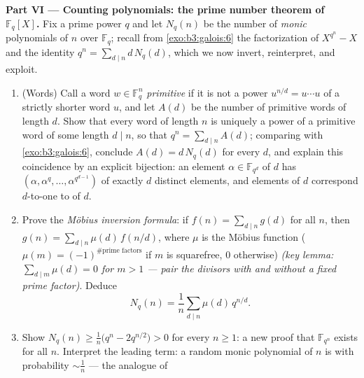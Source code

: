 \begin{problem}
\medskip
\noindent\textbf{Part VI --- Counting  polynomials:
the prime number theorem of $\mathbb F_q[X]$.} Fix a prime power
$q$ and let $N_q(n)$ be the number of \emph{monic }
polynomials of  $n$ over $\mathbb F_q$; recall from
\cref{exo:b3:galois:6} the factorization of $X^{q^n} - X$ and
the identity $q^n = \sum_{d\mid n}d\,N_q(d)$, which we now
invert, reinterpret, and exploit.
\begin{enumerate}[resume]
  \item (Words) Call a word $w \in \mathbb F_q^n$
        \emph{primitive} if it is not a power $u^{n/d} =
        u\cdots u$ of a strictly shorter word $u$, and let
        $A(d)$ be the number of primitive words of length $d$.
        Show that every word of length $n$ is uniquely a power
        of a primitive word of some length $d \mid n$, so that
        $q^n = \sum_{d \mid n}A(d)$; comparing with
        \cref{exo:b3:galois:6}, conclude $A(d) = d\,N_q(d)$
        for every $d$, and explain this coincidence by an
        explicit bijection: an element $\alpha \in
        \mathbb F_{q^d}$ of  $d$ has  
        $(\alpha, \alpha^q, \dots, \alpha^{q^{d-1}})$ of
        exactly $d$ distinct elements, and elements of 
        $d$ correspond $d$-to-one to  of 
        $d$.
  \item Prove the \emph{M\"obius inversion formula}: if $f(n) =
        \sum_{d\mid n}g(d)$ for all $n$, then $g(n) =
        \sum_{d\mid n}\mu(d)\,f(n/d)$, where $\mu$ is the
        M\"obius function ($\mu(m) = (-1)^{\#\text{prime
        factors}}$ if $m$ is squarefree, $0$ otherwise)
        \emph{(key lemma: $\sum_{d \mid m}\mu(d) = 0$ for $m >
        1$ --- pair the divisors with and without a fixed prime
        factor)}. Deduce
        \[
        N_q(n) = \frac1n\sum_{d \mid n}\mu(d)\,q^{n/d} .
        \]
  \item Show $N_q(n) \geq \frac1n\bigl(q^n - 2q^{n/2}\bigr) > 0$
        for every $n \geq 1$: a new proof that $\mathbb F_{q^n}$
        exists for all $n$. Interpret the leading term: a random
        monic polynomial of  $n$ is  with
        probability $\sim \frac1n$ --- the  analogue of

\end{enumerate}
\end{problem}

